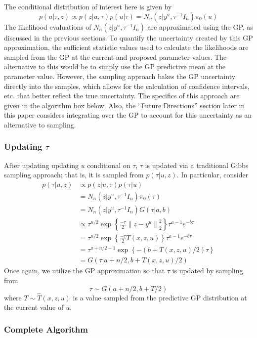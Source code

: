 \documentclass[12pt]{article}
\newcommand*{\norm}[1]{\left\lVert#1\right\rVert}
\begin{document}
The conditional distribution of interest here is given by 
\[p(u|\tau, z) \propto p(z|u, \tau)p(u|\tau) = N_n(z|y^u, \tau^{-1}I_n) \pi_0(u)\]
The likelihood evaluations of $N_n(z|y^u, \tau^{-1}I_n)$ are approximated using the GP, as discussed in the previous sections. To quantify the uncertainty created by this GP approximation, the sufficient statistic values
used to calculate the likelihoods are sampled from the GP at the current and proposed parameter values. The alternative to this would be to simply use the GP predictive mean at the parameter value. 
However, the sampling approach bakes the GP uncertainty directly into the samples, which allows for the calculation of confidence intervals, etc. that better reflect the true uncertainty. The specifics of this approach are
given in the algorithm box below. Also, the ``Future Directions'' section later in this paper considers integrating over the GP to account for this uncertainty as an alternative to sampling. 

\subsubsection{Updating $\tau$}
After updating updating $u$ conditional on $\tau$, $\tau$ is updated via a traditional Gibbs sampling approach; that is, it is sampled from $p(\tau|u, z)$. In particular, consider
\begin{align*}
p(\tau|u, z) &\propto p(z|u, \tau)p(\tau|u) \\
		 &= N_n(z|y^u, \tau^{-1}I_n)\pi_0(\tau) \\
		 &= N_n(z|y^u, \tau^{-1}I_n)G(\tau|a, b) \\
		 &\propto \tau^{n/2} \exp\left\{\frac{-\tau}{2} \norm{z - y^u}_2^2 \right\} \tau^{a - 1} e^{-b \tau} \\
		 &= \tau^{n/2} \exp\left\{\frac{-\tau}{2} T(x, z, u) \right\} \tau^{a - 1} e^{-b \tau} \\
		 &= \tau^{a + n/2 - 1} \exp\left\{-(b + T(x, z, u)/2)\tau \right\} \\
		 &= G\left(\tau|a + n/2, b + T(x, z, u)/2\right)
\end{align*}
Once again, we utilize the GP approximation so that $\tau$ is updated by sampling from
\[\tau \sim G\left(a + n/2, b + T/2\right) \]
where $T \sim \hat{T}(x, z, u)$ is a value sampled from the predictive GP distribution at the current value of $u$. 

\subsubsection{Complete Algorithm}
\end{document}
